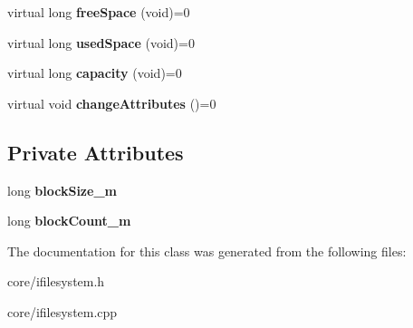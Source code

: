 \begin{DoxyCompactItemize}
virtual long {\bfseries free\+Space} (void)=0
\item 
\mbox{\label{classcore_1_1_i_file_system_a88692a64f0e55150680b81c1db4eb020}} 
virtual long {\bfseries used\+Space} (void)=0
\item 
\mbox{\label{classcore_1_1_i_file_system_a1051ca91a2c34231e437956a5a5b2acd}} 
virtual long {\bfseries capacity} (void)=0
\item 
\mbox{\label{classcore_1_1_i_file_system_a117d4301045c1f8cb85290f5c73e5c8b}} 
virtual void {\bfseries change\+Attributes} ()=0
\end{DoxyCompactItemize}
\subsection*{Private Attributes}
\begin{DoxyCompactItemize}
\item 
\mbox{\label{classcore_1_1_i_file_system_a6fc974f16f1350e21941989075e01023}} 
long {\bfseries block\+Size\+\_\+m}
\item 
\mbox{\label{classcore_1_1_i_file_system_ae87ddee28a5da64b90c2d197b83ed3c9}} 
long {\bfseries block\+Count\+\_\+m}
\end{DoxyCompactItemize}


The documentation for this class was generated from the following files\+:\begin{DoxyCompactItemize}
\item 
core/ifilesystem.\+h\item 
core/ifilesystem.\+cpp\end{DoxyCompactItemize}

